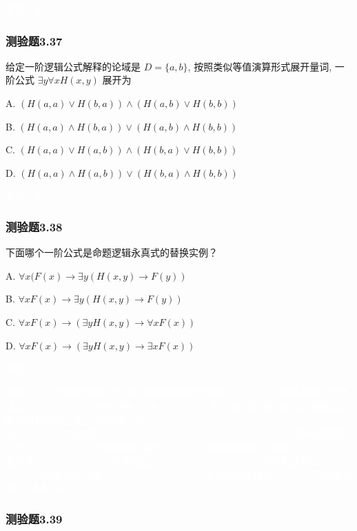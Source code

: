 \documentclass[UTF8, heading=true]{ctexart}
\begin{document}
\textcolor{white}{答案：A}

\subsubsection{测验题3.37}

给定一阶逻辑公式解释的论域是 $D=\{a, b\}$, 按照类似等值演算形式展开量词, 一阶公式 $\exists y \forall x H(x, y)$ 展开为 $\qquad$

A. $(H(a, a) \vee H(b, a)) \wedge(H(a, b) \vee H(b, b))$

B. $(H(a, a) \wedge H(b, a)) \vee(H(a, b) \wedge H(b, b))$

C. $(H(a, a) \vee H(a, b)) \wedge(H(b, a) \vee H(b, b))$

D. $(H(a, a) \wedge H(a, b)) \vee(H(b, a) \wedge H(b, b))$

\textcolor{white}{答案：B}


\subsubsection{测验题3.38}

下面哪个一阶公式是命题逻辑永真式的替换实例？

A. $\forall x(F(x) \rightarrow \exists y(H(x, y) \rightarrow F(y))$

B. $\forall x F(x) \rightarrow \exists y(H(x, y) \rightarrow F(y))$

C. $\forall x F(x) \rightarrow(\exists y H(x, y) \rightarrow \forall x F(x))$

D. $\forall x F(x) \rightarrow(\exists y H(x, y) \rightarrow \exists x F(x))$

\textcolor{white}{答案：C}

\textcolor{white}{解析：设 $A$ 是命题逻辑公式,其中出现的命题变量是 $p_1, p_2, \cdots, p_n$ ,用任意的一阶逻辑公式 $A_1, A_2, \cdots, A_n$ 分别替换 $A$ 中 $p_1, p_2, \cdots, p_n$ 的所有出现得到的一阶逻辑公式称为命题逻辑公式 $A$ 的替换实例。
\\ \indent 例： $(1)$ 一阶逻辑公式 $\forall x F(x) \rightarrow(\exists x G(x, y) \rightarrow \forall x F(x))$ 是命题逻辑公式 $p \rightarrow(q \rightarrow p)$ 的替换实例,是用 $\forall x F(x)$ 替换其中的 $p$ ,而用 $\exists x G(x, y)$ 替换其中的 $q$ 。
（2）一阶逻辑公式 $\forall x F(x) \rightarrow \forall x F(x)$ 是命题逻辑公式 $p \rightarrow p$ 的替换实例,但是 $\forall x(F(x) \rightarrow$ $F(x))$ 不是命题逻辑公式 $p \rightarrow p$ 的替换实例。（课本P86）}
\subsubsection{测验题3.39}
\end{document}
